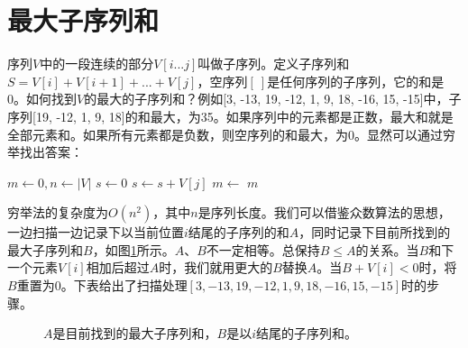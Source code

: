 \documentclass[b5paper]{ctexart}
\begin{document}
\section{最大子序列和}

序列$V$中的一段连续的部分$V[i...j]$叫做子序列。定义子序列和$S = V[i] + V[i+1] + ... + V[j]$，空序列$[\ ]$是任何序列的子序列，它的和是0。如何找到$V$的最大的子序列和\cite{Bentley}？例如[3, -13, 19, -12, 1, 9, 18, -16, 15, -15]中，子序列[19, -12, 1, 9, 18]的和最大，为35。如果序列中的元素都是正数，最大和就是全部元素和。如果所有元素都是负数，则空序列的和最大，为0。显然可以通过穷举找出答案：

\begin{algorithmic}[1]
  \State $m \gets 0, n \gets |V|$
    \State $s \gets 0$
      \State $s \gets s + V[j]$
      \State $m \gets $ 
    \EndFor
  \EndFor
  \State \Return $m$
\EndFunction
\end{algorithmic}

穷举法的复杂度为$O(n^2)$，其中$n$是序列长度。我们可以借鉴众数算法的思想，一边扫描一边记录下以当前位置$i$结尾的子序列的和$A$，同时记录下目前所找到的最大子序列和$B$，如图\ref{fig:max-sum-invariant}所示。$A$、$B$不一定相等。总保持$B \leq A$的关系。当$B$和下一个元素$V[i]$相加后超过$A$时，我们就用更大的$B$替换$A$。当$B + V[i] < 0$时，将$B$重置为0。下表给出了扫描处理$[3, -13, 19, -12, 1, 9, 18, -16, 15, -15]$时的步骤。

\begin{figure}[htbp]
 \centering
 \caption{$A$是目前找到的最大子序列和，$B$是以$i$结尾的子序列和。}
 \label{fig:max-sum-invariant}
\end{figure}
\end{document}
